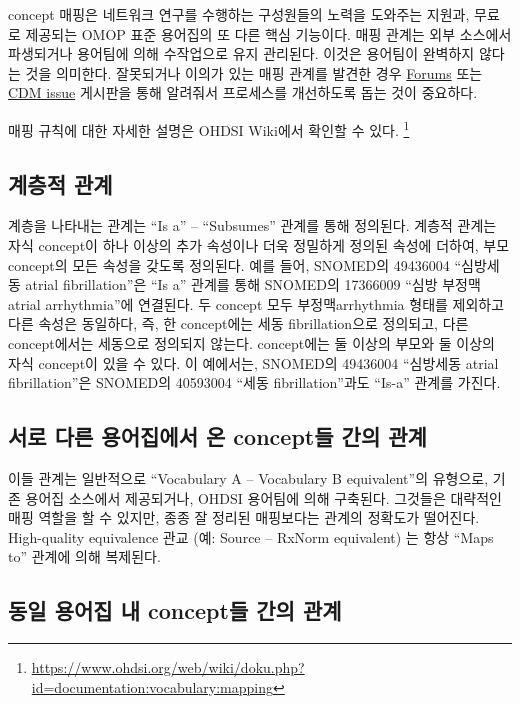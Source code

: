 \documentclass[11pt]{book}
\let\rmarkdownfootnote\footnote%
\def\footnote{\protect\rmarkdownfootnote}
\theoremstyle{definition}
\theoremstyle{definition}
\theoremstyle{definition}
\theoremstyle{remark}
\begin{document}
concept 매핑은 네트워크 연구를 수행하는 구성원들의 노력을 도와주는
지원과, 무료로 제공되는 OMOP 표준 용어집의 또 다른 핵심 기능이다. 매핑
관계는 외부 소스에서 파생되거나 용어팀에 의해 수작업으로 유지 관리된다.
이것은 용어팀이 완벽하지 않다는 것을 의미한다. 잘못되거나 이의가 있는
매핑 관계를 발견한 경우 \href{https://forums.ohdsi.org}{Forums} 또는
\href{https://github.com/OHDSI/CommonDataModel/issues}{CDM issue}
게시판을 통해 알려줘서 프로세스를 개선하도록 돕는 것이 중요하다.

매핑 규칙에 대한 자세한 설명은 OHDSI Wiki에서 확인할 수 있다. \footnote{\url{https://www.ohdsi.org/web/wiki/doku.php?id=documentation:vocabulary:mapping}}

\subsection{계층적 관계}\label{-}

계층을 나타내는 관계는 ``Is a'' -- ``Subsumes'' 관계를 통해 정의된다.
계층적 관계는 자식 concept이 하나 이상의 추가 속성이나 더욱 정밀하게
정의된 속성에 더하여, 부모 concept의 모든 속성을 갖도록 정의된다. 예를
들어, SNOMED의 49436004 ``심방세동 atrial fibrillation''은 ``Is a''
관계를 통해 SNOMED의 17366009 ``심방 부정맥 atrial arrhythmia''에
연결된다. 두 concept 모두 부정맥arrhythmia 형태를 제외하고 다른 속성은
동일하다, 즉, 한 concept에는 세동 fibrillation으로 정의되고, 다른
concept에서는 세동으로 정의되지 않는다. concept에는 둘 이상의 부모와 둘
이상의 자식 concept이 있을 수 있다. 이 예에서는, SNOMED의 49436004
``심방세동 atrial fibrillation''은 SNOMED의 40593004 ``세동
fibrillation''과도 ``Is-a'' 관계를 가진다. 

\subsection{서로 다른 용어집에서 온 concept들 간의
관계}\label{----concept--}

이들 관계는 일반적으로 ``Vocabulary A -- Vocabulary B equivalent''의
유형으로, 기존 용어집 소스에서 제공되거나, OHDSI 용어팀에 의해 구축된다.
그것들은 대략적인 매핑 역할을 할 수 있지만, 종종 잘 정리된 매핑보다는
관계의 정확도가 떨어진다. High-quality equivalence 관교 (예: Source --
RxNorm equivalent) 는 항상 ``Maps to'' 관계에 의해 복제된다.

\subsection{동일 용어집 내 concept들 간의 관계}\label{---concept--}
\end{document}

